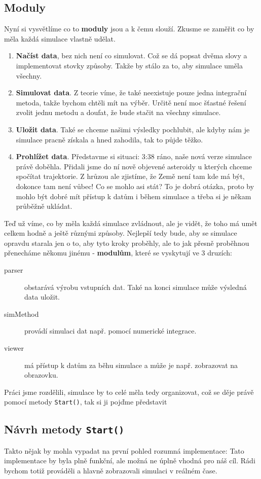 \subsection{Moduly}
\label{sub:moduly}
Nyní si vysvětlíme co to \textbf{moduly} jsou a k čemu slouží.
Zkusme se zaměřit co by měla každá simulace vlastně udělat.
\begin{enumerate}
	\item \textbf{Načíst data}, bez nich není co simulovat. Což se dá popsat dvěma slovy a implementovat stovky způsoby. Takže by stálo za to, aby simulace uměla všechny.
	\item \textbf{Simulovat data}. Z teorie víme, že také neexistuje pouze jedna integrační metoda, takže bychom chtěli mít na výběr. Určitě není moc šťastné řešení zvolit jednu metodu a doufat, že bude stačit na všechny simulace.
	\item \textbf{Uložit data}. Také se chceme našimi výsledky pochlubit, ale kdyby nám je simulace pracně získala a hned zahodila, tak to půjde těžko.
	\item \textbf{Prohlížet data}. Představme si situaci: 3:38 ráno, naše nová verze simulace právě doběhla. Přidali jsme do ní nově objevené asteroidy u kterých chceme spočítat trajektorie. Z hrůzou ale zjistíme, že Země není tam kde má být, dokonce tam není vůbec! Co se mohlo asi stát? To je dobrá otázka, proto by mohlo být dobré mít přístup k datům i během simulace a třeba si je někam průběžně ukládat.
\end{enumerate}
Teď už víme, co by měla každá simulace zvládnout, ale je vidět, že toho má umět celkem hodně a ještě různými způsoby. Nejlepší tedy bude, aby se simulace opravdu starala jen o to, aby tyto kroky proběhly, ale to jak přesně proběhnou přenecháme někomu jinému -\textbf{ modulům}, které se vyskytují ve 3 druzích:
\begin{description}
	\item[parser] obstarává výrobu vstupních dat. Také na konci simulace může výsledná data uložit.
	\item[simMethod] provádí simulaci dat např. pomocí numerické integrace.
	\item[viewer] má přístup k datům za běhu simulace a může je např. zobrazovat na obrazovku.
\end{description}
Práci jsme rozdělili, simulace by to celé měla tedy organizovat, což se děje právě pomocí metody \texttt{Start()}, tak si ji pojďme představit
\subsection{Návrh metody \texttt{Start()}}
\label{sec:startMetoda}
Takto nějak by mohla vypadat na první pohled rozumná implementace:
Tato implementace by byla plně funkční, ale možná ne úplně vhodná pro náš cíl. Rádi bychom totiž prováděli a hlavně zobrazovali simulaci v reálném čase. 
